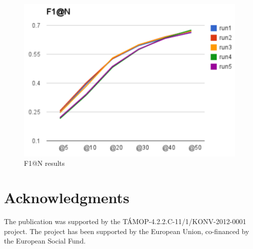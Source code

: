 \documentclass{acm_proc_article-me}
\begin{document}
\begin{figure}[h]
\includegraphics[width=0.9\linewidth]{f1}
\caption{F1@N results}
\label{fig:f1}
\end{figure}

\section{Acknowledgments}

The publication was supported by the T\'AMOP-4.2.2.C-11/1/KONV-2012-0001 project. The project has been supported by the European Union, co-financed by the European Social Fund.



\end{document}
